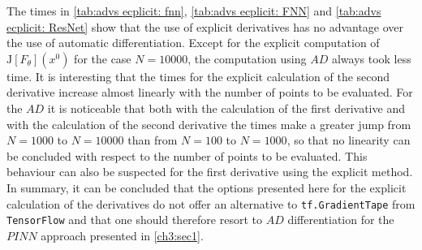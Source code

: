 The times in \cref{tab:advs ecplicit: fnn}, \cref{tab:advs ecplicit: FNN} and \cref{tab:advs ecplicit: ResNet} show that the use of explicit derivatives has no advantage over the use of automatic differentiation. Except for the explicit computation of $\mathrm{J} \left[ F_{\theta} \right]\left(x^0\right)$ for the case $N = 10000$, the computation using $AD$ always took less time. It is interesting that the times for the explicit calculation of the second derivative increase almost linearly with the number of points to be evaluated. For the $AD$ it is noticeable that both with the calculation of the first derivative and with the calculation of the second derivative the times make a greater jump from $N = 1000$ to $N = 10000$ than from $N = 100$ to $N = 1000$, so that no linearity can be concluded with respect to the number of points to be evaluated. This behaviour can also be suspected for the first derivative using the explicit method.  In summary, it can be concluded that the options presented here for the explicit calculation of the derivatives do not offer an alternative to \lstinline!tf.GradientTape! from \lstinline!TensorFlow! and that one should therefore resort to $AD$ differentiation for the $PINN$ approach presented in \cref{ch3:sec1}.